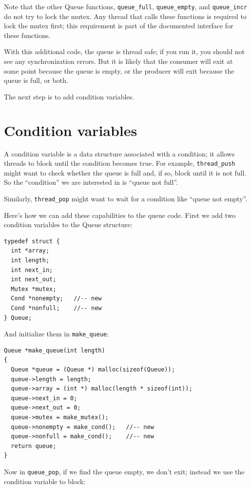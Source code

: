 \documentclass[12pt]{book}
\begin{document}
Note that the other Queue functions, \verb"queue_full",
\verb"queue_empty", and \verb"queue_incr" do not try to lock
the mutex.  Any thread that calls these functions is required to
lock the mutex first; this requirement is part of the documented
interface for these functions.

With this additional code, the queue is thread safe; if you run it, you
should not see any synchronization errors.  But it is likely
that the consumer will exit at some point because the queue is
empty, or the producer will exit because the queue is full,
or both.

The next step is to add condition variables.


\section{Condition variables}

A condition variable is a data structure associated with a condition;
it allows threads to block until the condition becomes true.  For
example, \verb"thread_push" might want to check whether the queue is
full and, if so, block until it is not full.  So the ``condition'' we
are interested in is ``queue not full''.

Similarly, \verb"thread_pop" might want to wait for a condition
like ``queue not empty''.

Here's how we can add these capabilities to the queue code.  First
we add two condition variables to the Queue structure:

\begin{verbatim}
typedef struct {
  int *array;
  int length;
  int next_in;
  int next_out;
  Mutex *mutex;
  Cond *nonempty;   //-- new
  Cond *nonfull;    //-- new
} Queue;
\end{verbatim}

And initialize them in \verb"make_queue":

\begin{verbatim}
Queue *make_queue(int length)
{
  Queue *queue = (Queue *) malloc(sizeof(Queue));
  queue->length = length;
  queue->array = (int *) malloc(length * sizeof(int));
  queue->next_in = 0;
  queue->next_out = 0;
  queue->mutex = make_mutex();
  queue->nonempty = make_cond();   //-- new
  queue->nonfull = make_cond();    //-- new
  return queue;
}
\end{verbatim}

Now in \verb"queue_pop", if we find the queue empty, we don't
exit; instead we use the condition variable to block:
\end{document}
